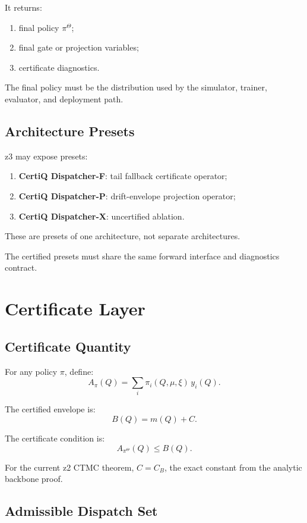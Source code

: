 \documentclass[a4paper,11pt]{article}
\theoremstyle{definition}
\begin{document}
It returns:
\begin{enumerate}
  \item final policy \(\pi^\Theta\);
  \item final gate or projection variables;
  \item certificate diagnostics.
\end{enumerate}

The final policy must be the distribution used by the simulator, trainer,
evaluator, and deployment path.

\subsection{Architecture Presets}

z3 may expose presets:
\begin{enumerate}
  \item \textbf{CertiQ Dispatcher-F}: tail fallback certificate operator;
  \item \textbf{CertiQ Dispatcher-P}: drift-envelope projection operator;
  \item \textbf{CertiQ Dispatcher-X}: uncertified ablation.
\end{enumerate}
These are presets of one architecture, not separate architectures.

The certified presets must share the same forward interface and diagnostics
contract.

\section{Certificate Layer}

\subsection{Certificate Quantity}

For any policy \(\pi\), define:
\[
A_\pi(Q)=\sum_i \pi_i(Q,\mu,\xi)\,y_i(Q).
\]

The certified envelope is:
\[
B(Q)=m(Q)+C.
\]

The certificate condition is:
\[
A_{\pi^\Theta}(Q)\le B(Q).
\]

For the current z2 CTMC theorem, \(C=C_B\), the exact constant from the
analytic backbone proof.

\subsection{Admissible Dispatch Set}
\end{document}
